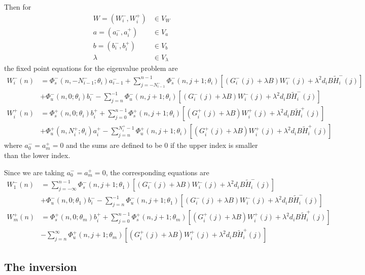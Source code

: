 \documentclass[12pt]{article}
\begin{document}
Then for
\begin{align*}
W = (W_i^-, W_i^+) &\in V_W \\
a = (a_i^-, a_i^+) &\in V_a \\
b = (b_i^-, b_i^+) &\in V_b \\
\lambda &\in V_\lambda
\end{align*}
the fixed point equations for the eigenvalue problem are
\begin{equation}\label{fpeig}
\begin{aligned}
W_i^-(n) &= 
\Phi_s^-(n, -N_{i-1}^-; \theta_i) a_{i-1}^- + \sum_{j = -N_{i-1}^-}^{n-1} \Phi_s^-(n, j+1; \theta_i)
[(G_i^-(j) + \lambda B) W_i^-(j) + \lambda^2 d_i B \tilde{H}_i^-(j)]
 \\
&+ \Phi_u^-(n, 0; \theta_i) b_i^- - \sum_{j = n}^{-1} \Phi_u^-(n, j+1; \theta_i) 
[(G_i^-(j) + \lambda B) W_i^-(j) + \lambda^2 d_i B \tilde{H}_i^-(j)] \\
W_i^+(n) &= \Phi_s^+(n, 0; \theta_i) b_i^+ + \sum_{j = 0}^{n-1} \Phi_s^+(n, j+1; \theta_i) 
[(G_i^+(j) + \lambda B) W_i^+(j) + \lambda^2 d_i B \tilde{H}_i^+(j)] \\
&+ \Phi_u^+(n, N_i^+; \theta_i) a_i^+ - \sum_{j = n}^{N_i^+-1} \Phi_u^+(n, j+1; \theta_i) 
[(G_i^+(j) + \lambda B) W_i^+(j) + \lambda^2 d_i B \tilde{H}_i^+(j)]
\end{aligned}
\end{equation}
where $a_0^- = a_m^+ = 0$ and the sums are defined to be $0$ if the upper index is smaller than the lower index. 

Since we are taking $a_0^- = a_m^+ = 0$, the corresponding equations are
\begin{align*}
W_1^-(n) &= \sum_{j = -\infty}^{n-1} \Phi_s^-(n, j+1; \theta_1)
[(G_i^-(j) + \lambda B) W_i^-(j) + \lambda^2 d_i B \tilde{H}_i^-(j)]
 \\
&+ \Phi_u^-(n, 0; \theta_1) b_i^- - \sum_{j = n}^{-1} \Phi_u^-(n, j+1; \theta_1) 
[(G_i^-(j) + \lambda B) W_i^-(j) + \lambda^2 d_i B \tilde{H}_i^-(j)] \\
W_m^+(n) &= \Phi_s^+(n, 0; \theta_m) b_i^+ + \sum_{j = 0}^{n-1} \Phi_s^+(n, j+1; \theta_m) 
[(G_i^+(j) + \lambda B) W_i^+(j) + \lambda^2 d_i B \tilde{H}_i^+(j)] \\
&- \sum_{j = n}^{\infty} \Phi_u^+(n, j+1; \theta_m) 
[(G_i^+(j) + \lambda B) W_i^+(j) + \lambda^2 d_i B \tilde{H}_i^+(j)]
\end{align*}

\subsection{The inversion}
\end{document}
